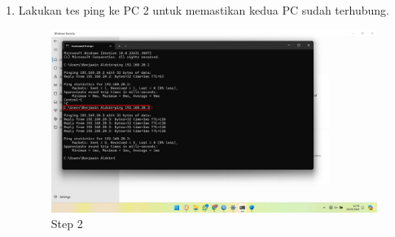 \begin{center}
\begin{enumerate}
		\item Lakukan tes ping ke PC 2 untuk memastikan kedua PC sudah terhubung.
		\begin{figure}[H]
			\centering
			\includegraphics[width=0.8\linewidth]{P4/img/pc1/Step 10.png}
			\caption{Step 2}
			\label{fig:Ping Step 2(PC 1)}
		\end{figure}
	\end{enumerate}


\end{center}
